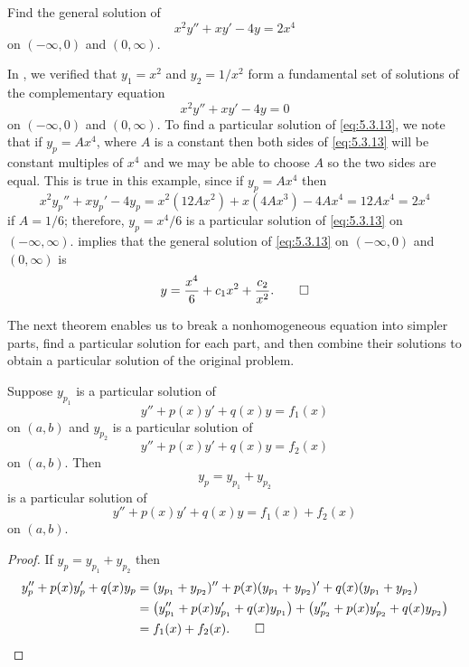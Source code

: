 \begin{example}\label{example:5.3.3}
Find the general solution of
\begin{equation} \label{eq:5.3.13}
x^2y''+xy'-4y=2x^4
\end{equation}
on $(-\infty,0)$ and $(0,\infty)$.
\end{example}

\begin{solution}
In ,  we verified that $y_1=x^2$ and $y_2=1/x^2$
form a fundamental set of solutions of the complementary equation
\[
x^2y''+xy'-4y=0
\]
on $(-\infty,0)$ and $(0,\infty)$.  To find a particular solution of
\eqref{eq:5.3.13}, we note that if
$y_p=Ax^4$, where $A$ is a constant then  both sides of \eqref{eq:5.3.13}
will be constant
multiples  of $x^4$ and  we may be able to choose  $A$ so the two sides
are equal. This is true in this example, since if $y_p=Ax^4$ then
\[
x^2y_p''+xy_p'-4y_p=x^2(12Ax^2)+x(4Ax^3)-4Ax^4=12Ax^4=2x^4
\]
if $A=1/6$;  therefore, $y_p=x^4/6$ is a particular solution of
\eqref{eq:5.3.13} on  $(-\infty,\infty)$.
 implies that the general solution of
\eqref{eq:5.3.13} on  $(-\infty,0)$ and  $(0,\infty)$ is
\[
y=\frac{x^4}{6}+c_1x^2+\frac{c_2}{x^2}.\qedhere
\]
\end{solution}



The next theorem enables us to break a nonhomogeneous equation into
simpler parts, find a particular solution for each part, and then
combine their solutions to obtain a particular solution of the
original problem.

\begin{theorem}\label{thmtype:5.3.3}
Suppose  $y_{p_1}$ is a particular solution of
\[
y''+p(x)y'+q(x)y=f_1(x)
\]
on $(a,b)$ and $y_{p_2}$ is a particular solution of
\[
y''+p(x)y'+q(x)y=f_2(x)
\]
on   $(a,b)$.
 Then
\[
y_p=y_{p_1}+y_{p_2}
\]
is a particular  solution of
\[
y''+p(x)y'+q(x)y=f_1(x)+f_2(x)
\]
on  $(a,b)$.
\end{theorem}

\begin{proof}
If $y_p=y_{p_1}+y_{p_2}$ then
\begin{align*}
y_p''+p(x)y_p'+q(x)y_p
&=(y_{p_1}+y_{p_2})''+p(x)(y_{p_1}+y_{p_2})'
+q(x)(y_{p_1}+y_{p_2})\\
&=\left(y_{p_1}''+p(x)y_{p_1}'+q(x)y_{p_1}\right)
+\left(y_{p_2}''+p(x)y_{p_2}'+q(x)y_{p_2}\right)\\
&=f_1(x)+f_2(x).\qedhere
\end{align*}
\end{proof}




